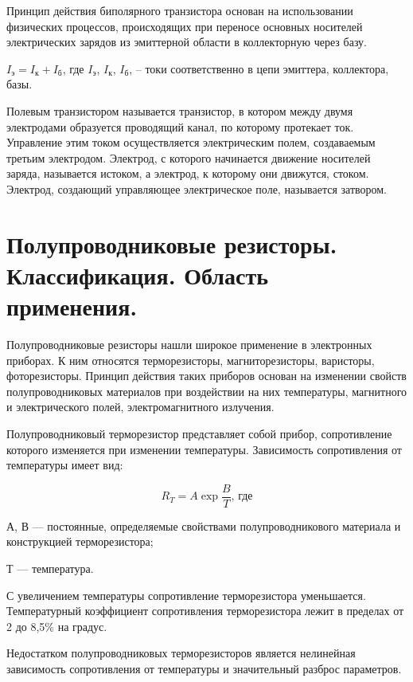 \documentclass[unicode, 12pt, a4paper, oneside]{article}
\begin{document}
Принцип действия биполярного транзистора основан на использовании физических процессов, происходящих при переносе основных носителей электрических зарядов из эмиттерной области в коллекторную через базу.

$I_\text{э} = I_\text{к} + I_\text{б}$, где $I_\text{э}$, $I_\text{к}$, $I_\text{б}$, – токи соответственно в цепи эмиттера, коллектора, базы.

Полевым транзистором называется транзистор, в котором между двумя электродами образуется проводящий канал, по которому протекает ток. Управление этим током осуществляется электрическим полем, создаваемым третьим электродом. Электрод, с которого начинается движение носителей заряда, называется истоком, а электрод, к которому они движутся, стоком. Электрод, создающий управляющее электрическое поле, называется затвором.


\section{Полупроводниковые резисторы. Классификация. Область применения.}

Полупроводниковые резисторы нашли широкое применение в электронных приборах. К ним относятся терморезисторы, магниторезисторы, варисторы, фоторезисторы. Принцип действия таких приборов основан на изменении свойств полупроводниковых материалов при воздействии на них температуры, магнитного и электрического полей, электромагнитного излучения.

Полупроводниковый терморезистор представляет собой прибор, сопротивление которого изменяется при изменении температуры. Зависимость сопротивления от температуры имеет вид:

\begin{equation}
R_{T}=A\exp{\frac{B}{T}}\text{, где}
\end{equation}
\par А, В --- постоянные, определяемые свойствами полупроводникового материала и конструкцией терморезистора;
\par Т --- температура.

С увеличением температуры сопротивление терморезистора уменьшается. Температурный коэффициент сопротивления терморезистора лежит в пределах от 2 до 8,5\% на градус.

Недостатком полупроводниковых терморезисторов является нелинейная зависимость сопротивления от температуры и значительный разброс параметров.
\end{document}
